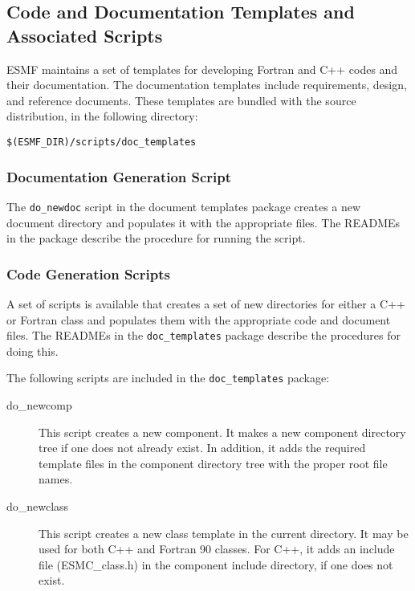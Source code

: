 
\subsection{Code and Documentation Templates and Associated Scripts}
\label{sec:code_templates}

ESMF maintains a set of templates for developing Fortran and 
C++ codes and their documentation.  The documentation templates
include requirements, design, and reference documents.
These templates are bundled with the source distribution, in 
the following directory:\newline
\begin{verbatim}
$(ESMF_DIR)/scripts/doc_templates 
\end{verbatim} 

\subsubsection{Documentation Generation Script}

The {\tt do\_newdoc} script in the document templates package creates
a new document directory and populates it with the appropriate files.
The READMEs in the package describe the procedure for running the 
script.

\subsubsection{Code Generation Scripts}
A set of scripts is available that creates a set of new directories for either 
a C++ or Fortran class and populates them with the appropriate code and 
document files.  The READMEs in the {\tt doc\_templates} 
package describe the procedures for doing this.  

The following scripts are included in the {\tt doc\_templates} package:
\begin{description}
\item [do\_newcomp] This script creates a new component. It makes a new component directory
tree if one does not already exist. In addition, it adds the required template files
in the component directory tree with the proper root file names.
\item [do\_newclass] This script creates a new class template in the current directory. 
It may be used for both C++ and Fortran 90 classes. For C++, it adds an include
file (ESMC\_class.h) in the component include directory, if one does not exist.
\end{description}

